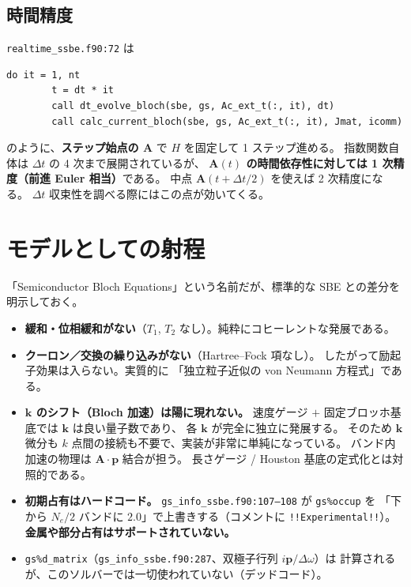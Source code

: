 \documentclass[dvipdfmx,a4paper,11pt]{jsarticle}
\newcommand{\file}[1]{\texttt{#1}}
\newcommand{\vk}{\bm{k}}
\newcommand{\vA}{\bm{A}}
\newcommand{\vp}{\bm{p}}
\newcommand{\dt}{\Delta t}
\begin{document}
\subsection{時間精度}

\file{realtime\_ssbe.f90:72} は
%
\begin{lstlisting}[firstnumber=70,caption={時間発展ループ（\texttt{realtime\_ssbe.f90}）}]
    do it = 1, nt
        t = dt * it
        call dt_evolve_bloch(sbe, gs, Ac_ext_t(:, it), dt)
        call calc_current_bloch(sbe, gs, Ac_ext_t(:, it), Jmat, icomm)
\end{lstlisting}
%
のように、\textbf{ステップ始点の $\vA$} で $H$ を固定して 1 ステップ進める。
指数関数自体は $\dt$ の 4 次まで展開されているが、
\textbf{$\vA(t)$ の時間依存性に対しては 1 次精度（前進 Euler 相当）}である。
中点 $\vA(t + \dt/2)$ を使えば 2 次精度になる。
$\dt$ 収束性を調べる際にはこの点が効いてくる。

\section{モデルとしての射程}

「Semiconductor Bloch Equations」という名前だが、標準的な SBE との差分を
明示しておく。

\begin{itemize}
\item \textbf{緩和・位相緩和がない}（$T_1$, $T_2$ なし）。純粋にコヒーレントな発展である。
\item \textbf{クーロン／交換の繰り込みがない}（Hartree--Fock 項なし）。
      したがって励起子効果は入らない。実質的に
      「独立粒子近似の von Neumann 方程式」である。
\item \textbf{$\vk$ のシフト（Bloch 加速）は陽に現れない。}
      速度ゲージ $+$ 固定ブロッホ基底では $\vk$ は良い量子数であり、
      各 $\vk$ が完全に独立に発展する。
      そのため $\vk$ 微分も $k$ 点間の接続も不要で、実装が非常に単純になっている。
      バンド内加速の物理は $\vA\cdot\vp$ 結合が担う。
      長さゲージ / Houston 基底の定式化とは対照的である。
\item \textbf{初期占有はハードコード。}
      \file{gs\_info\_ssbe.f90:107--108} が \file{gs\%occup} を
      「下から $N_e/2$ バンドに $2.0$」で上書きする（コメントに \verb|!!Experimental!!|）。
      \textbf{金属や部分占有はサポートされていない。}
\item \file{gs\%d\_matrix}（\file{gs\_info\_ssbe.f90:287}、双極子行列 $i\vp/\Delta\omega$）は
      計算されるが、このソルバーでは一切使われていない（デッドコード）。
\end{itemize}
\end{document}
